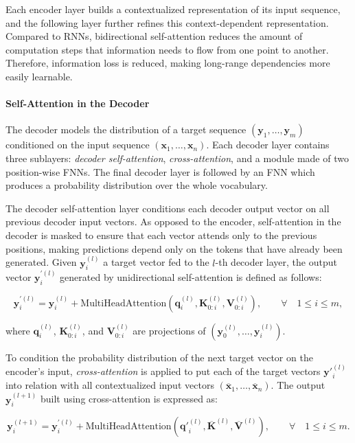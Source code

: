 Each encoder layer builds a contextualized representation of its input sequence, and the following layer further refines this context-dependent representation. Compared to \acp{RNN}, bidirectional self-attention reduces the amount of computation steps that information needs to flow from one point to another. Therefore, information loss is reduced, making long-range dependencies more easily learnable. 

\paragraph{Self-Attention in the Decoder} The decoder models the distribution of a target sequence $(\bm{y}_1, \ldots, \bm{y}_m)$ conditioned on the input sequence $(\bm{x}_1, \ldots, \bm{x}_n)$. Each decoder layer contains three sublayers: \textit{decoder self-attention}, \textit{cross-attention}, and a module made of two position-wise \acp{FNN}. The final decoder layer is followed by an \ac{FNN} which produces a probability distribution over the whole vocabulary. 

The decoder self-attention layer conditions each decoder output vector on all previous decoder input vectors. As opposed to the encoder, self-attention in the decoder is masked to ensure that each vector attends only to the previous positions, making predictions depend only on the tokens that have already been generated. Given $\bm{y}^{(l)}_i$ a target vector fed to the $l$-th decoder layer, the output vector $\bm{y}^{\prime(l)}_i$ generated by unidirectional self-attention is defined as follows:

\begin{equation}
    \bm{y}^{\prime(l)}_i = \bm{y}^{(l)}_i + \textrm{MultiHeadAttention}\left(\bm{q}^{(l)}_i, \bm{K}^{(l)}_{0:i}, \bm{V}^{(l)}_{0:i}\right), \qquad \forall \quad 1 \leq i \leq m,
\end{equation}

\noindent where $\bm{q}^{(l)}_i$, $\bm{K}^{(l)}_{0:i}$, and $\bm{V}^{(l)}_{0:i}$ are projections of $(\bm{y}^{(l)}_0, \ldots, \bm{y}^{(l)}_i)$.

To condition the probability distribution of the next target vector on the encoder's input, \textit{cross-attention} is applied to put each of the target vectors $\bm{y}'^{(l)}_i$ into relation with all contextualized input vectors $(\overline{\bm{x}}_1, \ldots, \overline{\bm{x}}_n)$. The output $\bm{y}^{(l+1)}_i$ built using cross-attention is expressed as:

\begin{equation}
    \bm{y}^{(l+1)}_i = \bm{y}^{\prime(l)}_i + \textrm{MultiHeadAttention}\left(\bm{q}'^{(l)}_i, \overline{\bm{K}}^{(l)}, \overline{\bm{V}}^{(l)}\right), \qquad \forall \quad 1 \leq i \leq m.
\end{equation}

